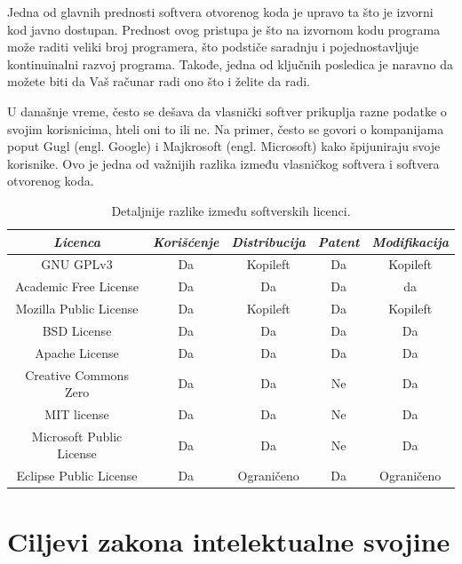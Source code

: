 \documentclass[a4paper]{article}
\begin{document}
Jedna od glavnih prednosti softvera otvorenog koda je upravo ta što je izvorni kod javno dostupan. \cite{opensource} Prednost ovog pristupa je 
što na izvornom kodu programa može raditi veliki broj programera, što podstiče saradnju i pojednostavljuje kontinuinalni 
razvoj programa. Takođe, jedna od ključnih posledica je naravno da možete biti da Vaš računar radi ono što i želite da radi. 

U današnje vreme, često se dešava da vlasnički softver prikuplja razne podatke o svojim korisnicima,
hteli oni to ili ne. Na primer, često se govori o kompanijama poput Gugl (engl. Google) i Majkrosoft (engl. Microsoft) 
kako špijuniraju svoje korisnike. Ovo je jedna od važnijih razlika između vlasničkog softvera i softvera otvorenog koda.

\begin{table}[h!]
    \begin{center}
        \caption{ Detaljnije razlike između softverskih licenci. }
        \begin{tabular}{|c|c|c|c|c|} \hline
            \emph{Licenca} & \emph{Korišćenje} & \emph{Distribucija} & \emph{Patent} & \emph{Modifikacija} \\ \hline
            GNU GPLv3 & Da & Kopileft & Da & Kopileft\\ \hline
            Academic Free License & Da & Da & Da & da \\ \hline
            Mozilla Public License & Da & Kopileft & Da & Kopileft \\ \hline
            BSD License & Da & Da & Da & Da \\ \hline
            Apache License & Da & Da & Da & Da  \\ \hline
            Creative Commons Zero & Da & Da & Ne & Da \\ \hline
            MIT license & Da & Da & Ne & Da \\ \hline
            Microsoft Public License & Da & Da & Ne & Da \\ \hline
            Eclipse Public License & Da & Ograničeno & Da & Ograničeno \\ \hline
        \end{tabular}
        \label{tab:tabela1}
    \end{center}
\end{table}

\section{Ciljevi zakona intelektualne svojine}
\end{document}
